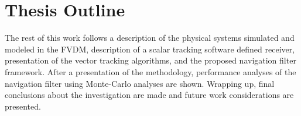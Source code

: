 \section{\textbf{Thesis Outline}}
The rest of this work follows a description of the physical systems simulated and modeled in the FVDM, description of a scalar tracking software defined receiver, presentation of the vector tracking algorithms, and the proposed navigation filter framework. After a presentation of the methodology, performance analyses of the navigation filter using Monte-Carlo analyses are shown. Wrapping up, final conclusions about the investigation are made and future work considerations are presented.